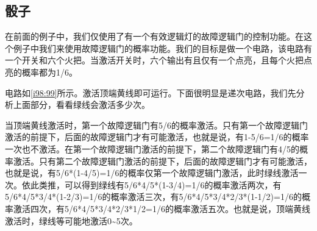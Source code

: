 \subsection{骰子}

在前面的例子中，我们仅使用了有一个有效逻辑灯的故障逻辑门的控制功能。在这个例子中我们来使用故障逻辑门的概率功能。我们的目标是做一个电路，该电路有一个开关和六个火把。当激活开关时，六个输出有且仅有一个点亮，且每个火把点亮的概率都为1/6。

电路如\autoref{i98:99}所示。激活顶端黄线即可运行。下面很明显是递次电路，我们先分析上面部分，看看绿线会激活多少次。

\begin{figure}[!h]
\begin{center}
\end{center}
\caption{}
\label{i98:99}
\end{figure}

当顶端黄线激活时，第一个故障逻辑门有5/6的概率激活。只有第一个故障逻辑门激活的前提下，后面的故障逻辑门才有可能激活，也就是说，有1-5/6=1/6的概率一次也不激活。在第一个故障逻辑门激活的前提下，第二个故障逻辑门有4/5的概率激活。只有第二个故障逻辑门激活的前提下，后面的故障逻辑门才有可能激活，也就是说，有5/6*(1-4/5)=1/6的概率仅第一个故障逻辑门激活，此时绿线激活一次。依此类推，可以得到绿线有5/6*4/5*(1-3/4)=1/6的概率激活两次，有5/6*4/5*3/4*(1-2/3)=1/6的概率激活三次，有5/6*4/5*3/4*2/3*(1-1/2)=1/6的概率激活四次，有5/6*4/5*3/4*2/3*1/2=1/6的概率激活五次。也就是说，顶端黄线激活时，绿线等可能地激活0\~{}5次。

